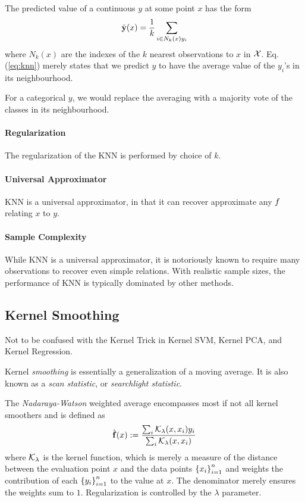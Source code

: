 The predicted value of a continuous $y$ at some point $x$ has the form
\begin{align}
\label{eq:knn}
	\hat{\mathbf{y}}(x)=\frac{1}{k}\sum_{i \in N_k(x) y_i}
\end{align}
where $N_k(x)$ are the indexes of the $k$ nearest observations to $x$ in $\mathcal{X}$.
Eq.(\ref{eq:knn}) merely states that we predict $y$ to have the average value of the $y_i$'s in its neighbourhood.

For a categorical $y$, we would replace the averaging with a majority vote of the classes in its neighbourhood.

\paragraph{Regularization}
The regularization of the KNN is performed by choice of $k$.

\paragraph{Universal Approximator}
KNN is a universal approximator, in that it can recover approximate any $f$ relating $x$ to $y$.

\paragraph{Sample Complexity}
While KNN is a universal approximator, it is notoriously known to require many observations to recover even simple relations. With realistic sample sizes, the performance of KNN is typically dominated by other methods.




\subsection{Kernel Smoothing}
\label{sec:kernel}

Not to be confused with the Kernel Trick in Kernel SVM, Kernel PCA, and Kernel Regression.

Kernel \emph{smoothing} is essentially a generalization of a moving average.
It is also known as a \emph{scan statistic}, or \emph{searchlight statistic}.

The \emph{Nadaraya-Watson} weighted average encompasses most if not all kernel smoothers and is defined as 
\begin{align}
\label{eq:nadaraya_watson}
	\hat{\mathbf{f}}(x):= \frac{\sum_i \mathcal{K}_\lambda(x,x_i)y_i}{\sum_i \mathcal{K}_\lambda(x,x_i)}
\end{align}
where $\mathcal{K}_\lambda$ is the kernel function, which is merely a measure of the distance between the evaluation point $x$ and the data points $\left\{  x_i  \right\}_{i=1}^n$ and weights the contribution of each $\left\{  y_i  \right\}_{i=1}^n$ to the value at $x$.
The denominator merely ensures the weights sum to $1$.
Regularization is controlled by the $\lambda$ parameter.

